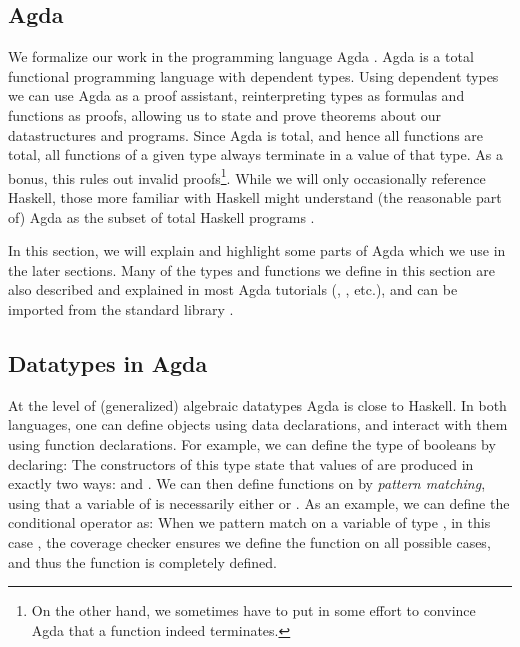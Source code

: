 \subsection{Agda}\label{sec:background-agda}
We formalize our work in the programming language Agda \cite{agda}. Agda is a total functional programming language with dependent types. Using dependent types we can use Agda as a proof assistant, reinterpreting types as formulas and functions as proofs, allowing us to state and prove theorems about our datastructures and programs. Since Agda is total, and hence all functions are total, all functions of a given type always terminate in a value of that type. As a bonus, this rules out invalid proofs\footnote{On the other hand, we sometimes have to put in some effort to convince Agda that a function indeed terminates.}. While we will only occasionally reference Haskell, those more familiar with Haskell might understand (the reasonable part of) Agda as the subset of total Haskell programs \cite{agda2hs}.

In this section, we will explain and highlight some parts of Agda which we use in the later sections. Many of the types and functions we define in this section are also described and explained in most Agda tutorials (\cite{ulftutorial}, \cite{plfa}, etc.), and can be imported from the standard library \cite{agdastdlib}.


\subsection{Datatypes in Agda}\label{sec:background-data}
At the level of (generalized) algebraic datatypes Agda is close to Haskell. In both languages, one can define objects using data declarations, and interact with them using function declarations. For example, we can define the type of booleans by declaring:
The constructors of this type state that values of  are produced in exactly two ways:  and . We can then define functions on  by \emph{pattern matching}, using that a variable of  is necessarily either  or . As an example, we can define the conditional operator as:
When we pattern match on a variable of type , in this case , the coverage checker ensures we define the function on all possible cases, and thus the function is completely defined.

